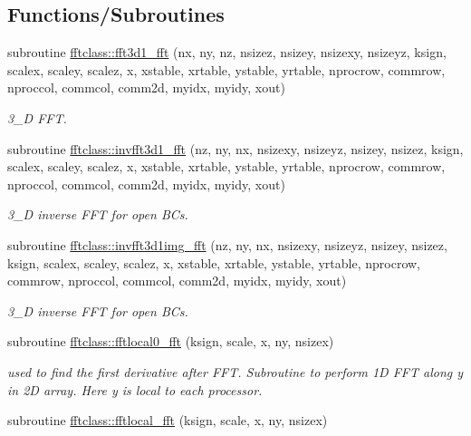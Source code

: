 \subsection*{Functions/\+Subroutines}
\begin{DoxyCompactItemize}
\item 
subroutine \mbox{\hyperlink{namespacefftclass_acef38aed3ece8d2c1120ce0004e6297e}{fftclass\+::fft3d1\+\_\+fft}} (nx, ny, nz, nsizez, nsizey, nsizexy, nsizeyz, ksign, scalex, scaley, scalez, x, xstable, xrtable, ystable, yrtable, nprocrow, commrow, nproccol, commcol, comm2d, myidx, myidy, xout)
\begin{DoxyCompactList}\small\item\em 3\+\_\+D F\+FT. \end{DoxyCompactList}\item 
subroutine \mbox{\hyperlink{namespacefftclass_a21e8a7bd2877ec439bc4f0e0bc0e4681}{fftclass\+::invfft3d1\+\_\+fft}} (nz, ny, nx, nsizexy, nsizeyz, nsizey, nsizez, ksign, scalex, scaley, scalez, x, xstable, xrtable, ystable, yrtable, nprocrow, commrow, nproccol, commcol, comm2d, myidx, myidy, xout)
\begin{DoxyCompactList}\small\item\em 3\+\_\+D inverse F\+FT for open B\+Cs. \end{DoxyCompactList}\item 
subroutine \mbox{\hyperlink{namespacefftclass_a374c599138aeca237d4c303a07a470ee}{fftclass\+::invfft3d1img\+\_\+fft}} (nz, ny, nx, nsizexy, nsizeyz, nsizey, nsizez, ksign, scalex, scaley, scalez, x, xstable, xrtable, ystable, yrtable, nprocrow, commrow, nproccol, commcol, comm2d, myidx, myidy, xout)
\begin{DoxyCompactList}\small\item\em 3\+\_\+D inverse F\+FT for open B\+Cs. \end{DoxyCompactList}\item 
subroutine \mbox{\hyperlink{namespacefftclass_a501325267c1425bfece04a18e20efe31}{fftclass\+::fftlocal0\+\_\+fft}} (ksign, scale, x, ny, nsizex)
\begin{DoxyCompactList}\small\item\em used to find the first derivative after F\+FT. Subroutine to perform 1D F\+FT along y in 2D array. Here y is local to each processor. \end{DoxyCompactList}\item 
subroutine \mbox{\hyperlink{namespacefftclass_aa64d94b8c8578b384955207a409a2445}{fftclass\+::fftlocal\+\_\+fft}} (ksign, scale, x, ny, nsizex)

\end{DoxyCompactItemize}
